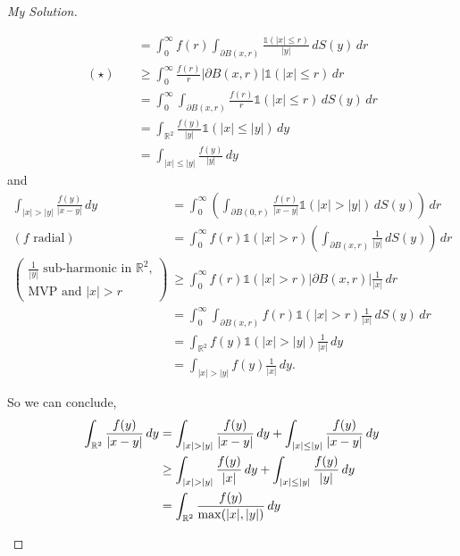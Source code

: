 \documentclass{report}
\theoremstyle{tommy}
\begin{document}
\begin{proof}[My Solution]
\begin{enumerate}[label=\alph*)]
\begin{align*}
        &= \int_0^\infty f(r) \int_{\partial B(x,r)} \frac{\mathbb{1}(|x| \le r)}{|y|} \, dS(y) \, dr \\
        (\star) \quad &\ge \int_0^\infty  \frac{f(r)}{r} |\partial B(x, r)| \mathbb{1}(|x| \le r) \, dr \\
        &= \int_0^\infty \int_{\partial B(x, r)} \frac{f(r)}{r} \mathbb{1}(|x| \le r) \, dS(y) \, dr \\
        &= \int_{\mathbb{R}^2} \frac{f(y)}{|y|}\mathbb{1}(|x| \le |y|) \, dy \\
        &= \int_{|x| \le |y|} \frac{f(y)}{|y|} \, dy
      \end{align*}
      and
      \begin{align*}
        \int_{|x| > |y|} \frac{f(y)}{|x-y|} \, dy 
        &= \int_0^\infty \left(\int_{\partial B(0, r)} \frac{f(r)}{|x-y|}\mathbb{1}(|x| > |y|) \, dS(y)\right) \, dr \\
        (f \text{ radial}) \quad &= \int_0^\infty f(r) \mathbb{1}(|x| > r)\left(\int_{\partial B(x,r)} \frac{1}{|y|} \, dS(y)\right) \, dr \\
        \left(\begin{aligned}
          \frac{1}{|y|} \text{ sub-harmonic in \(\mathbb{R}^2\),} \\ \text{MVP and } |x| > r
        \end{aligned}\right)
         \quad 
        &\ge \int_0^\infty f(r) \mathbb{1}(|x| > r)|\partial B(x,r)|\frac{1}{|x|} \, dr \\
        &= \int_0^\infty \int_{\partial B(x,r)} f(r) \mathbb{1}(|x| > r) \frac{1}{|x|} \, dS(y) \, dr \\
        &= \int_{\mathbb{R}^2} f(y) \mathbb{1}(|x| > |y|) \frac{1}{|x|} \, dy \\
        &= \int_{|x| > |y|} f(y) \frac{1}{|x|} \, dy.
      \end{align*}

      So we can conclude, 
      \begin{align*}
        \int_{\mathbb{R}^2} \frac{f(y)}{|x-y|} \, dy &= \int_{|x| > |y|} \frac{f(y)}{|x-y|} \, dy + \int_{|x| \le |y|} \frac{f(y)}{|x-y|} \, dy \\
        &\ge \int_{|x| > |y|}  \frac{f(y)}{|x|} \, dy + \int_{|x| \le |y|} \frac{f(y)}{|y|} \, dy \\
        &= \int_{\mathbb{R}^2} \frac{f(y)}{\max(|x|, |y|)} \, dy \qedhere
      \end{align*}
    \end{enumerate}
  \end{proof}
\end{document}
